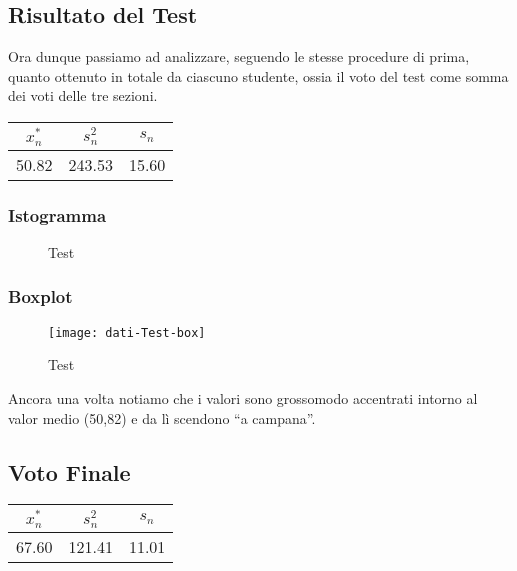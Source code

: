\thispagestyle{empty} %
\subsection{Risultato del Test}
Ora dunque passiamo ad analizzare, seguendo le stesse procedure di prima, quanto ottenuto in totale da ciascuno studente, ossia il voto del test come somma dei voti delle tre sezioni.
\begin{center}
\begin{tabular}{|c|c|c|}
  \hline
  \(x_{n}^{*}\) & \(s_n^2\) & \(s_n\) \\
  \hline
  50.82 & 243.53 & 15.60 \\
  \hline
\end{tabular}
\end{center}

\subsubsection{Istogramma}
\begin{figure}[!h]
  \caption{Test}
\end{figure}

\subsubsection{Boxplot}
\begin{figure}[!h]
  \centering
  \texttt{[image: dati-Test-box]}
  \caption{Test}
\end{figure}
Ancora una volta notiamo che i valori sono grossomodo accentrati intorno al valor medio (50,82) e da lì scendono “a campana”.
\restoregeometry
\clearpage
\thispagestyle{empty} %
\subsection{Voto Finale}

\begin{center}
\begin{tabular}{|c|c|c|}
  \hline
  \(x_{n}^{*}\) & \(s_n^2\) & \(s_n\) \\
  \hline
 67.60 & 121.41 & 11.01 \\ 
  \hline
\end{tabular}
\end{center}

